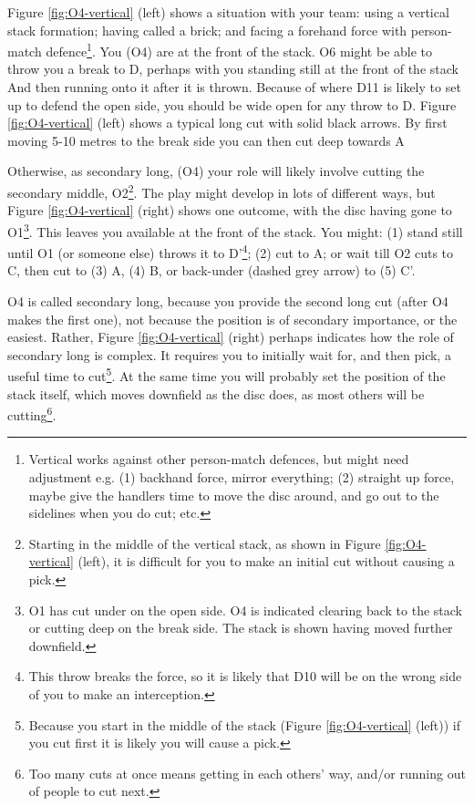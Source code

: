 \documentclass{tufte-handout}
\begin{document}
Figure \ref{fig:O4-vertical} (left) shows 
a situation 
with 
your team: 
using 
a vertical stack formation; 
having called a brick; and
facing a 
forehand force with 
person-match defence\footnote{
Vertical works
against other person-match defences, 
but might need 
adjustment e.g. 
(1) backhand force,
mirror everything;
(2) straight up force, 
maybe give the handlers 
time to move the disc around, 
and go out to the sidelines
when you do cut; etc.}. 
You (O4) 
are at the front 
of the stack.
O6 might be able 
to throw you
a break
to D, 
perhaps with you 
standing still 
at the front of the stack 
And then running onto it after it is thrown. 
Because of where D11 
is likely to set up 
to defend the open side, 
you should be wide open
for any throw to D. 
Figure \ref{fig:O4-vertical} (left) 
shows 
a typical 
long cut with
solid black arrows. 
By first moving 
5-10 metres 
to the break side 
you can then 
cut deep 
towards A

Otherwise, 
as secondary long, 
(O4) 
your role 
will likely 
involve cutting 
the secondary middle, O2\footnote{
Starting
in the middle of the vertical stack,
as shown in 
Figure \ref{fig:O4-vertical} (left),
it is difficult for 
you to make 
an initial cut 
without causing 
a pick.}.
The play might develop 
in lots of different ways, 
but
Figure \ref{fig:O4-vertical} (right) shows 
one outcome, 
with the disc 
having gone 
to O1\footnote{
O1 has cut under 
on the open side.
O4 is indicated 
clearing 
back to the stack 
or cutting 
deep on 
the break side. 
The stack is shown having 
moved further downfield.}. 
This leaves 
you 
available 
at the front of the stack. 
You might: 
(1) stand still until O1
(or someone else)  
throws it 
to D'\footnote{
This throw 
breaks the force, 
so it is likely 
that D10 will 
be on the wrong side 
of you to make an interception.};
(2) cut to A;
or wait till O2 
cuts to C, 
then cut to (3) A,
(4) B, or 
back-under 
(dashed grey arrow) 
to (5) C'.  

O4 is called secondary long, 
because you provide the second 
long cut 
(after O4 makes the first one), 
not 
because the position 
is of secondary importance, 
or the easiest. 
Rather, 
Figure \ref{fig:O4-vertical} (right)
perhaps indicates 
how 
the role of 
secondary long 
is complex. 
It requires you to  
initially wait for, 
and then pick, 
a useful time to cut\footnote{
Because you start 
in the middle of the stack 
(Figure \ref{fig:O4-vertical} (left)) 
if you cut first it is likely you will 
cause a pick.}. 
At the same time
you will probably  
set the position 
of the stack itself,
which moves downfield 
as the disc does, 
as most others 
will be  
cutting\footnote{
Too many cuts at once 
means getting 
in each others' way, 
and/or running out of people
to cut next.}. 
\end{document}
